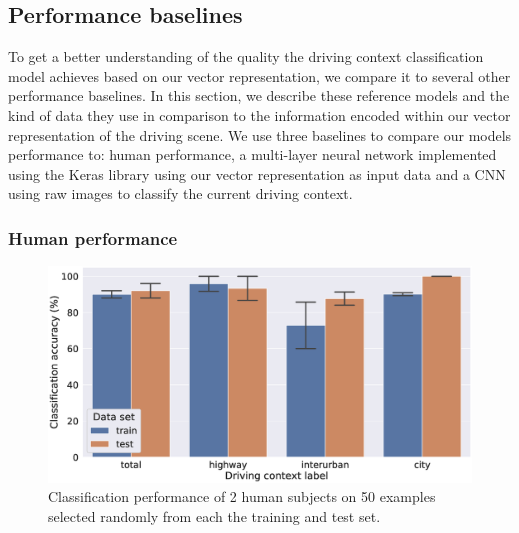 \subsection{Performance baselines}%
\label{subsec:performance_baselines}

To get a better understanding of the quality the driving context classification model achieves based on our vector representation, we compare it to several other performance baselines.
In this section, we describe these reference models and the kind of data they use in comparison to the information encoded within our vector representation of the driving scene.
We use three baselines to compare our models performance to: human performance, a multi-layer neural network implemented using the Keras library \parencite{Chollet2015keras} using our vector representation as input data and a \ac{CNN} using raw images to classify the current driving context.

\subsubsection{Human performance}%
\label{ssubsec:human_performance}

\begin{figure}[t]
    \centering
    \includegraphics[width=1.0\linewidth]{imgs/context_class_human_train_test.eps}
    \caption{Classification performance of \num{2} human subjects on \num{50} examples selected randomly from each the training and test set.}
    \label{fig:context_class_human_train_test}
\end{figure}

